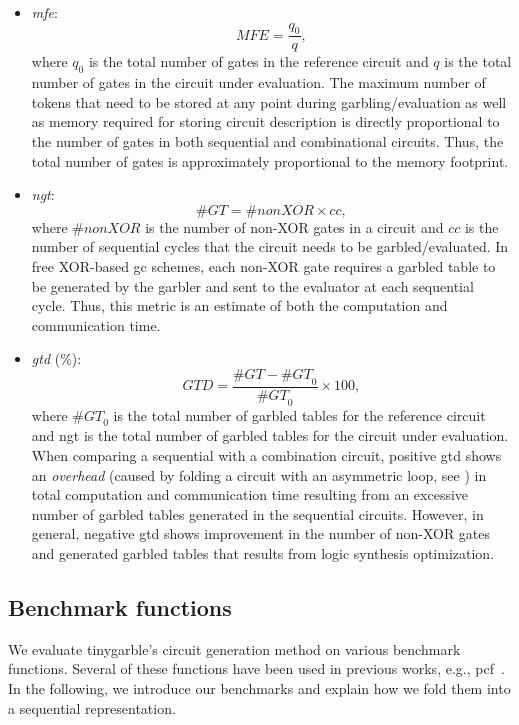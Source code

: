 \begin{itemize}
\item \textit{\acrfull{mfe}}: $$\mathit{MFE} = \dfrac{q_{0}}{q},$$ where $q_{0}$ is the total number of gates in the reference circuit and $q$ is the total number of gates in the circuit under evaluation.
		The maximum number of tokens that need to be stored at any point during garbling/evaluation as well as memory required for storing circuit description is directly proportional to the number of gates in both sequential and combinational circuits.
		Thus, the total number of gates is approximately proportional to the memory footprint.

\item \textit{\acrfull{ngt}}: $$\mathit{\#GT} = \#nonXOR\times cc,$$ where $\#nonXOR$ is the number of non-XOR gates in a circuit and $cc$ is the number of sequential cycles that the circuit needs to be garbled/evaluated.
		In free XOR-based \acrshort{gc} schemes, each non-XOR gate requires a garbled table to be generated by the garbler and sent to the evaluator at each sequential cycle.
		Thus, this metric is an estimate of both the computation and communication time.

\item \textit{\acrfull{gtd}} (\%): $$\mathit{GTD} = \dfrac{\mathit{\#GT} - \mathit{\#GT}_{0}}{\mathit{\#GT}_{0}} \times 100,$$ where $\mathit{\#GT}_{0}$ is the total number of garbled tables for the reference circuit and \acrshort{ngt} is the total number of garbled tables for the circuit under evaluation.
		When comparing a sequential with a combination circuit, positive \acrshort{gtd} shows an \emph{overhead} (caused by folding a circuit with an asymmetric loop, see ) in total computation and communication time resulting from an excessive number of garbled tables generated in the sequential circuits.
		However, in general, negative \acrshort{gtd} shows improvement in the number of non-XOR gates and generated garbled tables that results from logic synthesis optimization.
\end{itemize}

\subsection{Benchmark functions}\label{ssec:eval-tinygarble-benchmark}
We evaluate \gls{tinygarble}'s circuit generation method on various benchmark functions.
Several of these functions have been used in previous works, e.g., \gls{pcf}~\cite{kreuter2013pcf}.
In the following, we introduce our benchmarks and explain how we fold them into a sequential representation.

